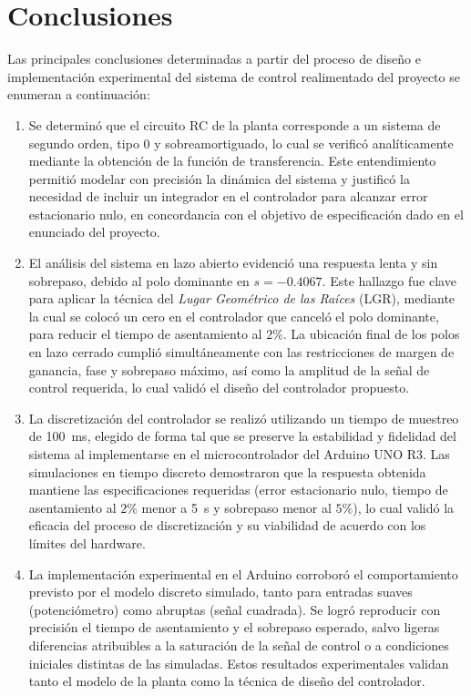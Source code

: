 
\section{Conclusiones}

Las principales conclusiones determinadas a partir del proceso de diseño e implementación experimental del sistema de control realimentado del proyecto se enumeran a continuación:

\begin{enumerate}
    \item Se determinó que el circuito RC de la planta corresponde a un sistema de segundo orden, tipo 0 y sobreamortiguado, lo cual se verificó analíticamente mediante la obtención de la función de transferencia. Este entendimiento permitió modelar con precisión la dinámica del sistema y justificó la necesidad de incluir un integrador en el controlador para alcanzar error estacionario nulo, en concordancia con el objetivo de especificación dado en el enunciado del proyecto.
    
    \item El análisis del sistema en lazo abierto evidenció una respuesta lenta y sin sobrepaso, debido al polo dominante en $s=-0.4067$. Este hallazgo fue clave para aplicar la técnica del \textit{Lugar Geométrico de las Raíces} (LGR), mediante la cual se colocó un cero en el controlador que canceló el polo dominante, para reducir el tiempo de asentamiento al $2\%$. La ubicación final de los polos en lazo cerrado cumplió simultáneamente con las restricciones de margen de ganancia, fase y sobrepaso máximo, así como la amplitud de la señal de control requerida, lo cual validó el diseño del controlador propuesto.
    
    \item La discretización del controlador se realizó utilizando un tiempo de muestreo de \SI{100}{\milli\second}, elegido de forma tal que se preserve la estabilidad y fidelidad del sistema al implementarse en el microcontrolador del Arduino UNO R3. Las simulaciones en tiempo discreto demostraron que la respuesta obtenida mantiene las especificaciones requeridas (error estacionario nulo, tiempo de asentamiento al $2\%$ menor a \SI{5}{\second} y sobrepaso menor al $5\%$), lo cual validó la eficacia del proceso de discretización y su viabilidad de acuerdo con los límites del hardware.
    
    \item La implementación experimental en el Arduino corroboró el comportamiento previsto por el modelo discreto simulado, tanto para entradas suaves (potenciómetro) como abruptas (señal cuadrada). Se logró reproducir con precisión el tiempo de asentamiento y el sobrepaso esperado, salvo ligeras diferencias atribuibles a la saturación de la señal de control o a condiciones iniciales distintas de las simuladas. Estos resultados experimentales validan tanto el modelo de la planta como la técnica de diseño del controlador.
\end{enumerate}